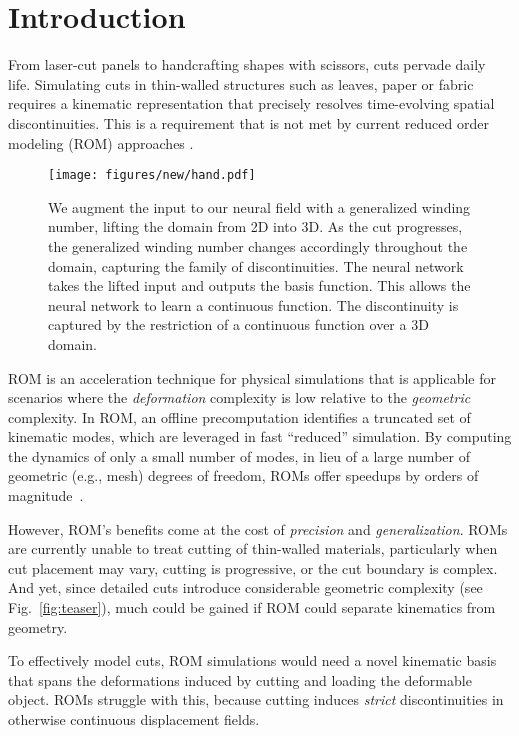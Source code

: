 \section{Introduction}
\label{sec:introduction}
From laser-cut panels to handcrafting shapes with scissors, cuts pervade daily life. Simulating cuts in thin-walled structures such as leaves, paper or fabric requires a kinematic representation that precisely resolves time-evolving spatial discontinuities. This is a requirement that is not met by current reduced order modeling (ROM) approaches \cite{barbivc2005real}.

\begin{figure*}
\texttt{[image: figures/new/hand.pdf]}
\vspace{-20pt}
\caption{We augment the input to our neural field with a generalized winding number, lifting the domain from 2D into 3D. As the cut progresses, the generalized winding number changes accordingly throughout the domain, capturing the family of discontinuities. The neural network takes the lifted input and outputs the basis function. This allows the neural network to learn a continuous function. The discontinuity is captured by the restriction of a continuous function over a 3D domain.}
\label{fig:hand}
\end{figure*}


ROM is an acceleration technique for physical simulations that is applicable for scenarios where the \emph{deformation} complexity is low relative to the \emph{geometric} complexity. In ROM, an offline precomputation identifies a truncated set of kinematic modes, which are leveraged in fast ``reduced'' simulation. By computing the dynamics of only a small number of modes, in lieu of a large number of geometric (e.g., mesh) degrees of freedom, ROMs offer speedups by orders of magnitude~\cite{benner2015survey}. 

However, ROM's benefits come at the cost of \emph{precision} and \emph{generalization}. ROMs are currently unable to treat cutting of thin-walled materials, particularly when cut placement may vary, cutting is progressive, or the cut boundary is complex. And yet, since detailed cuts introduce considerable geometric complexity (see Fig.~\ref{fig:teaser}), much could be gained if ROM could separate kinematics from geometry.

To effectively model cuts, ROM simulations would need a novel kinematic basis that spans the deformations induced by cutting and loading the deformable object. ROMs struggle with this, because cutting induces \emph{strict} discontinuities in otherwise continuous displacement fields. 

